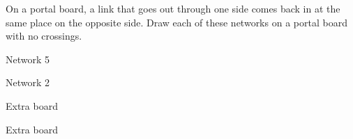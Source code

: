 \begin{minipage}[t]{10.9cm}\vspace{0pt}\raggedright
\problem On a portal board, a link that goes out through one side comes back in at the same place on the opposite side. Draw each of these networks on a portal board with no crossings.
\end{minipage}\hfill
\begin{minipage}[t]{6.3cm}\vspace{10pt}\raggedleft

\end{minipage}

\vspace{12pt}
\noindent\begin{minipage}[t]{8.2cm}\centering
\par\vspace{6pt}
Network 5
\end{minipage}\hfill
\begin{minipage}[t]{8.2cm}\centering
\par\vspace{6pt}
Network 2
\end{minipage}

\vspace{14pt}
\noindent\begin{minipage}[t]{8.2cm}\centering
\par\vspace{4pt}
{\small Extra board}
\end{minipage}\hfill
\begin{minipage}[t]{8.2cm}\centering
\par\vspace{4pt}
{\small Extra board}
\end{minipage}
